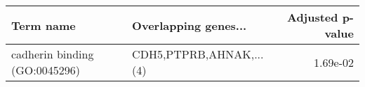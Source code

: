 \begin{tabular}{llr}
\toprule
                    Term name &    Overlapping genes... &  Adjusted p-value \\
\midrule
cadherin binding (GO:0045296) & CDH5,PTPRB,AHNAK,...(4) &          1.69e-02 \\
\bottomrule
\end{tabular}
